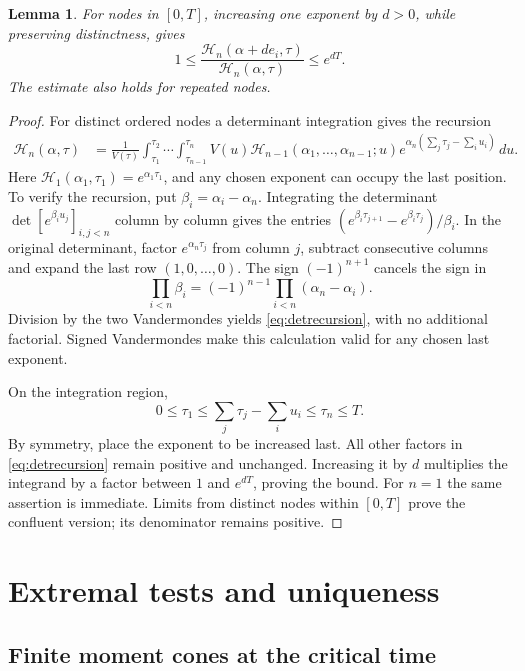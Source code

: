\documentclass[11pt]{article}
\newtheorem{lemma}[theorem]{Lemma}
\theoremstyle{remark}
\begin{document}
\begin{lemma}\label{lem:detbound}
For nodes in $[0,T]$, increasing one exponent by $d>0$, while preserving
distinctness, gives
\begin{equation}\label{eq:detbound}
 1\le\frac{\mathcal H_n(\alpha+d e_i,\tau)}
              {\mathcal H_n(\alpha,\tau)}\le e^{dT}.
\end{equation}
The estimate also holds for repeated nodes.
\end{lemma}
\begin{proof}
For distinct ordered nodes a determinant integration gives the recursion
\begin{align}\label{eq:detrecursion}
 \mathcal H_n(\alpha,\tau)
 &=\frac1{V(\tau)}
 \int_{\tau_1}^{\tau_2}\cdots\int_{\tau_{n-1}}^{\tau_n}
 V(u)\mathcal H_{n-1}(\alpha_1,\ldots,\alpha_{n-1};u)
 e^{\alpha_n(\sum_j\tau_j-\sum_i u_i)}\,du .
\end{align}
Here $\mathcal H_1(\alpha_1,\tau_1)=e^{\alpha_1\tau_1}$, and any chosen
exponent can occupy the last position. To verify the recursion, put
$\beta_i=\alpha_i-\alpha_n$. Integrating the determinant
$\det[e^{\beta_i u_j}]_{i,j<n}$ column by column gives the entries
$(e^{\beta_i\tau_{j+1}}-e^{\beta_i\tau_j})/\beta_i$.
In the original determinant, factor $e^{\alpha_n\tau_j}$ from column $j$,
subtract consecutive columns and expand the last row $(1,0,\ldots,0)$.
The sign $(-1)^{n+1}$ cancels the sign in
\[
 \prod_{i<n}\beta_i=(-1)^{n-1}\prod_{i<n}(\alpha_n-\alpha_i).
\]
Division by the two Vandermondes yields \eqref{eq:detrecursion}, with no
additional factorial. Signed Vandermondes make this calculation valid for
any chosen last exponent.

On the integration region,
\[
 0\le\tau_1\le\sum_j\tau_j-\sum_i u_i\le\tau_n\le T.
\]
By symmetry, place the exponent to be increased last. All other factors in
\eqref{eq:detrecursion} remain positive and unchanged. Increasing it by $d$
multiplies the integrand by a factor between $1$ and $e^{dT}$, proving the
bound. For $n=1$ the same assertion is immediate. Limits from distinct nodes
within $[0,T]$ prove the confluent version; its denominator remains positive.
\end{proof}

\section{Extremal tests and uniqueness}\label{sec:uniqueness}

\subsection{Finite moment cones at the critical time}
\end{document}
